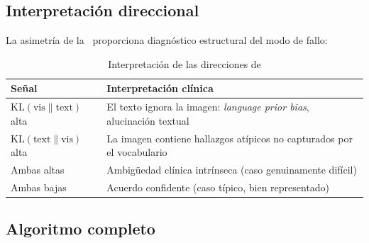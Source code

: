 \documentclass[12pt,a4paper]{article}
\newcommand{\KL}{\mathrm{KL}}
\begin{document}
\subsection{Interpretación direccional}

La asimetría de la \KL\ proporciona diagnóstico estructural del modo de fallo:

\begin{table}[H]
\centering
\caption{Interpretación de las direcciones de \KL}
\label{tab:interpretacion-kl}
\begin{tabularx}{\textwidth}{XX}
\toprule
\textbf{Señal} & \textbf{Interpretación clínica} \\
\midrule
$\KL(\text{vis} \| \text{text})$ alta & El texto ignora la imagen: \textit{language prior bias}, alucinación textual \\
$\KL(\text{text} \| \text{vis})$ alta & La imagen contiene hallazgos atípicos no capturados por el vocabulario \\
Ambas altas & Ambigüedad clínica intrínseca (caso genuinamente difícil) \\
Ambas bajas & Acuerdo confidente (caso típico, bien representado) \\
\bottomrule
\end{tabularx}
\end{table}

\subsection{Algoritmo completo}
\end{document}
